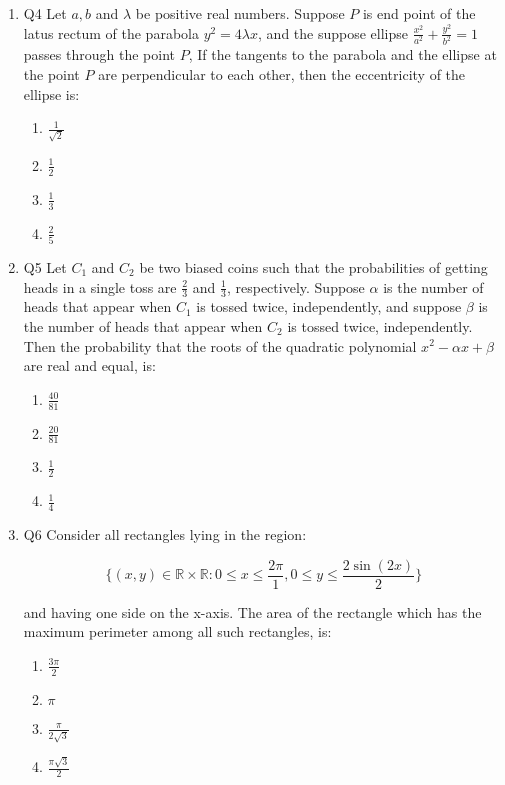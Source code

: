 \documentclass{article}
\begin{document}
\begin{enumerate}
\item Q4 Let $a, b$ and $\lambda$ be positive real numbers. Suppose $P$ is end point of the latus rectum of the parabola $y^2 = 4\lambda x$, and the suppose ellipse $\frac{x^2}{a^2} + \frac{y^2}{b^2} = 1$ passes through the point $P$, If the tangents to the parabola and the ellipse at the point $P$ are perpendicular to each other, then the eccentricity of the ellipse is:

    \begin{enumerate}
        \item  $\frac{1}{\sqrt{2}}$
        \item  $\frac{1}{2}$
        \item  $\frac{1}{3}$
        \item  $\frac{2}{5}$
    \end{enumerate}

\item Q5 Let $C_1$ and $C_2$ be two biased coins such that the probabilities of getting heads in a single toss are $\frac{2}{3}$ and $\frac{1}{3}$, respectively. Suppose $\alpha$ is the number of heads that appear when $C_1$ is tossed twice, independently, and suppose $\beta$ is the number of heads that appear when $C_2$ is tossed twice, independently. Then the probability that the roots of the quadratic polynomial $x^2 - \alpha x +\beta$ are real and equal, is:

    \begin{enumerate}
        \item  $\frac{40}{81}$
        \item  $\frac{20}{81}$
        \item  $\frac{1}{2}$
        \item  $\frac{1}{4}$
    \end{enumerate}

\item Q6 Consider all rectangles lying in the region:

\[
	\{(x,y) \in \mathbb{R} \times \mathbb{R} : 0 \leq x \leq \frac{2\pi} 1, 0 \leq y \leq \frac{2\sin(2x)}{2}\}
\]

    and having one side on the x-axis. The area of the rectangle which has the maximum perimeter among all such rectangles, is:

    \begin{enumerate}
        \item  $\frac{3\pi}{2}$
        \item  $\pi$
        \item  $\frac{\pi}{2\sqrt{3}}$
        \item  $\frac{\pi\sqrt{3}}{2}$
    \end{enumerate}


\end{enumerate}
\end{document}
